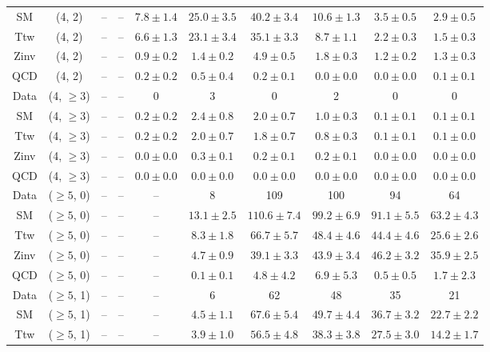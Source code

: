 \begin{table}[h!]
{\begin{tabular}{cccccccccc}
	SM & (4, 2) & -- & -- & $7.8\pm 1.4$ & $25.0\pm 3.5$ & $40.2\pm 3.4$ & $10.6\pm 1.3$ & $3.5\pm 0.5$ & $2.9\pm 0.5$ \\[0.5ex] 
	Ttw & (4, 2) & -- & -- & $6.6\pm 1.3$ & $23.1\pm 3.4$ & $35.1\pm 3.3$ & $8.7\pm 1.1$ & $2.2\pm 0.3$ & $1.5\pm 0.3$ \\[0.5ex] 
	Zinv & (4, 2) & -- & -- & $0.9\pm 0.2$ & $1.4\pm 0.2$ & $4.9\pm 0.5$ & $1.8\pm 0.3$ & $1.2\pm 0.2$ & $1.3\pm 0.3$ \\[0.5ex] 
	QCD & (4, 2) & -- & -- & $0.2\pm 0.2$ & $0.5\pm 0.4$ & $0.2\pm 0.1$ & $0.0\pm 0.0$ & $0.0\pm 0.0$ & $0.1\pm 0.1$ \\[0.5ex] 
	Data & (4, $\ge3$) & -- & -- & 0 & 3 & 0 & 2 & 0 & 0 \\[0.5ex] 
	SM & (4, $\ge3$) & -- & -- & $0.2\pm 0.2$ & $2.4\pm 0.8$ & $2.0\pm 0.7$ & $1.0\pm 0.3$ & $0.1\pm 0.1$ & $0.1\pm 0.1$ \\[0.5ex] 
	Ttw & (4, $\ge3$) & -- & -- & $0.2\pm 0.2$ & $2.0\pm 0.7$ & $1.8\pm 0.7$ & $0.8\pm 0.3$ & $0.1\pm 0.1$ & $0.1\pm 0.0$ \\[0.5ex] 
	Zinv & (4, $\ge3$) & -- & -- & $0.0\pm 0.0$ & $0.3\pm 0.1$ & $0.2\pm 0.1$ & $0.2\pm 0.1$ & $0.0\pm 0.0$ & $0.0\pm 0.0$ \\[0.5ex] 
	QCD & (4, $\ge3$) & -- & -- & $0.0\pm 0.0$ & $0.0\pm 0.0$ & $0.0\pm 0.0$ & $0.0\pm 0.0$ & $0.0\pm 0.0$ & $0.0\pm 0.0$ \\[0.5ex] 
	Data & ($\ge5$, 0) & -- & -- & -- & 8 & 109 & 100 & 94 & 64 \\[0.5ex] 
	SM & ($\ge5$, 0) & -- & -- & -- & $13.1\pm 2.5$ & $110.6\pm 7.4$ & $99.2\pm 6.9$ & $91.1\pm 5.5$ & $63.2\pm 4.3$ \\[0.5ex] 
	Ttw & ($\ge5$, 0) & -- & -- & -- & $8.3\pm 1.8$ & $66.7\pm 5.7$ & $48.4\pm 4.6$ & $44.4\pm 4.6$ & $25.6\pm 2.6$ \\[0.5ex] 
	Zinv & ($\ge5$, 0) & -- & -- & -- & $4.7\pm 0.9$ & $39.1\pm 3.3$ & $43.9\pm 3.4$ & $46.2\pm 3.2$ & $35.9\pm 2.5$ \\[0.5ex] 
	QCD & ($\ge5$, 0) & -- & -- & -- & $0.1\pm 0.1$ & $4.8\pm 4.2$ & $6.9\pm 5.3$ & $0.5\pm 0.5$ & $1.7\pm 2.3$ \\[0.5ex] 
	Data & ($\ge5$, 1) & -- & -- & -- & 6 & 62 & 48 & 35 & 21 \\[0.5ex] 
	SM & ($\ge5$, 1) & -- & -- & -- & $4.5\pm 1.1$ & $67.6\pm 5.4$ & $49.7\pm 4.4$ & $36.7\pm 3.2$ & $22.7\pm 2.2$ \\[0.5ex] 
	Ttw & ($\ge5$, 1) & -- & -- & -- & $3.9\pm 1.0$ & $56.5\pm 4.8$ & $38.3\pm 3.8$ & $27.5\pm 3.0$ & $14.2\pm 1.7$ \\[0.5ex] 

\end{tabular}}
\end{table}
